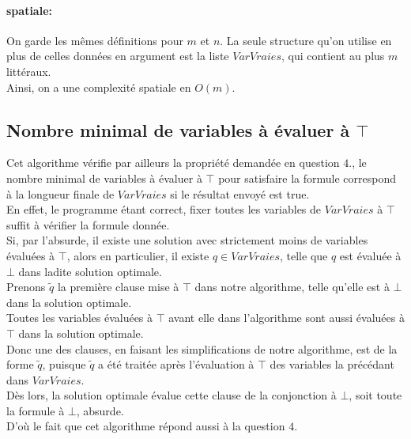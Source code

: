 \documentclass{article}
\begin{document}
\paragraph{spatiale:}
On garde les mêmes définitions pour $m$ et $n$.
\newline La seule structure qu'on utilise en plus de celles données en argument est la liste $VarVraies$, qui contient au plus $m$ littéraux. \\
Ainsi, on a une complexité spatiale en $O(m)$.

\subsection{Nombre minimal de variables à évaluer à $\top$}
Cet algorithme vérifie par ailleurs la propriété demandée en question $4.$, le nombre minimal de variables à évaluer à $\top$ pour satisfaire la formule correspond à la longueur finale de $VarVraies$ si le résultat envoyé est true.\\
En effet, le programme étant correct, fixer toutes les variables de $VarVraies$ à $\top$ suffit à vérifier la formule donnée.\\
Si, par l'absurde, il existe une solution avec strictement moins de variables évaluées à $\top$, alors en particulier, il existe $q\in VarVraies$, telle que $q$ est évaluée à $\bot$ dans ladite solution optimale.\\
Prenons $\tilde{q}$ la première clause mise à $\top$ dans notre algorithme, telle qu'elle est à $\bot$ dans la solution optimale.\\
Toutes les variables évaluées à $\top$ avant elle dans l'algorithme sont aussi évaluées à $\top$ dans la solution optimale. \\
Donc une des clauses, en faisant les simplifications de notre algorithme, est de la forme $\tilde{q}$, puisque $\tilde{q}$ a été traitée après l'évaluation à $\top$ des variables la précédant dans $VarVraies$.\\
Dès lors, la solution optimale évalue cette clause de la conjonction à $\bot$, soit toute la formule à $\bot$, absurde.\\
D'où le fait que cet algorithme répond aussi à la question $4.$
\end{document}
